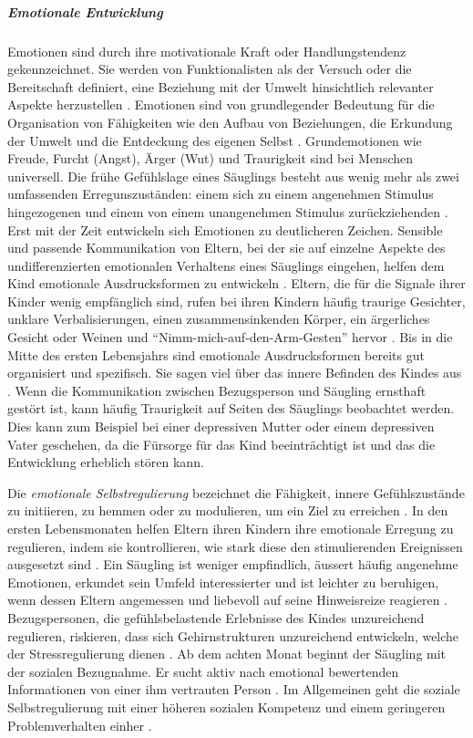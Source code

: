 \subparagraph{Emotionale Entwicklung}\label{par:EmotionaleEntwicklung}
Emotionen sind durch ihre motivationale Kraft oder Handlungstendenz gekennzeichnet. Sie werden von Funktionalisten als der Versuch oder die Bereitschaft definiert, eine Beziehung mit der Umwelt hinsichtlich relevanter Aspekte herzustellen \cite[S.~529 ff.]{Siegler2008}. Emotionen sind von grundlegender Bedeutung für die Organisation von Fähigkeiten wie den Aufbau von Beziehungen, die Erkundung der Umwelt und die Entdeckung des eigenen Selbst \nohyphens{\cite{Halle2003, Saarni2006}}. Grundemotionen wie Freude, Furcht (Angst), Ärger (Wut) und Traurigkeit sind bei Menschen universell. Die frühe Gefühlslage eines Säuglings besteht aus wenig mehr als zwei umfassenden Erregunszuständen: einem sich zu einem angenehmen Stimulus hingezogenen und einem von einem unangenehmen Stimulus zurückziehenden \nohyphens{\cite{Camras2003, Fox1991}}. Erst mit der Zeit entwickeln sich Emotionen zu deutlicheren Zeichen. Sensible und passende Kommunikation von Eltern, bei der sie auf einzelne Aspekte des undifferenzierten emotionalen Verhaltens eines Säuglings eingehen, helfen dem Kind emotionale Ausdrucksformen zu entwickeln \cite{Gergely1999}. Eltern, die für die Signale ihrer Kinder wenig empfänglich sind, rufen bei ihren Kindern häufig traurige Gesichter, unklare Verbalisierungen, einen zusammensinkenden Körper, ein ärgerliches Gesicht oder Weinen und \enquote{Nimm-mich-auf-den-Arm-Gesten} hervor \nohyphens{\cite{Weinberg1994, Yale1999}}. Bis in die Mitte des ersten Lebensjahrs sind emotionale Ausdrucksformen bereits gut organisiert und spezifisch. Sie sagen viel über das innere Befinden des Kindes aus \cite{Berk2011}. Wenn die Kommunikation zwischen Bezugsperson und Säugling ernsthaft gestört ist, kann häufig Traurigkeit auf Seiten des Säuglings beobachtet werden. Dies kann zum Beispiel bei einer depressiven Mutter oder einem depressiven Vater geschehen, da die Fürsorge für das Kind beeinträchtigt ist und das die Entwicklung erheblich stören kann.

Die \textit{emotionale Selbstregulierung} bezeichnet die Fähigkeit, innere Gefühlszustände zu initiieren, zu hemmen oder zu modulieren, um ein Ziel zu erreichen \cite{Siegler2008}. In den ersten Lebensmonaten helfen Eltern ihren Kindern ihre emotionale Erregung zu regulieren, indem sie kontrollieren, wie stark diese den stimulierenden Ereignissen ausgesetzt sind \cite{Gianino1988}. Ein Säugling ist weniger empfindlich, äussert häufig angenehme Emotionen, erkundet sein Umfeld interessierter und ist leichter zu beruhigen, wenn dessen Eltern angemessen und liebevoll auf seine Hinweisreize reagieren \cite{Crockenberg2004}. Bezugspersonen, die gefühlsbelastende Erlebnisse des Kindes unzureichend regulieren, riskieren, dass sich Gehirnstrukturen unzureichend entwickeln, welche der Stressregulierung dienen \cite[S.~250]{Berk2011}. Ab dem achten Monat beginnt der Säugling mit der sozialen Bezugnahme. Er sucht aktiv nach emotional bewertenden Informationen von einer ihm vertrauten Person \cite{Mumme2007}. Im Allgemeinen geht die soziale Selbstregulierung mit einer höheren sozialen Kompetenz und einem geringeren Problemverhalten einher \cite[S.~580]{Siegler2008}. 

